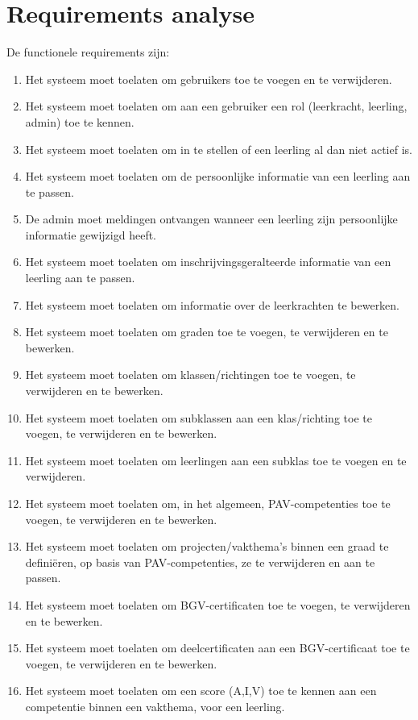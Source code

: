 \documentclass[a4paper]{article}
\begin{document}
\section{Requirements analyse} 
De functionele requirements zijn:
\begin{enumerate}
\item Het systeem moet toelaten om gebruikers toe te voegen en te verwijderen.
\item Het systeem moet toelaten om aan een gebruiker een rol (leerkracht, leerling, admin) toe te kennen.
\item Het systeem moet toelaten om in te stellen of een leerling al dan niet actief is.
\item Het systeem moet toelaten om de persoonlijke informatie van een leerling aan te passen.
\item De admin moet meldingen ontvangen wanneer een leerling zijn persoonlijke informatie gewijzigd heeft.
\item Het systeem moet toelaten om inschrijvingsgeralteerde informatie van een leerling aan te passen.
\item Het systeem moet toelaten om informatie over de leerkrachten te bewerken.
\item Het systeem moet toelaten om graden toe te voegen, te verwijderen en te bewerken.
\item Het systeem moet toelaten om klassen/richtingen toe te voegen, te verwijderen en te bewerken.
\item Het systeem moet toelaten om subklassen aan een klas/richting toe te voegen, te verwijderen en te bewerken.  %
\item Het systeem moet toelaten om leerlingen aan een subklas toe te voegen en te verwijderen.
\item Het systeem moet toelaten om, in het algemeen, PAV-competenties toe te voegen, te verwijderen en te bewerken.
\item Het systeem moet toelaten om projecten/vakthema's binnen een graad te definiëren, op basis van PAV-competenties, ze te verwijderen en aan te passen.
\item Het systeem moet toelaten om BGV-certificaten toe te voegen, te verwijderen en te bewerken.
\item Het systeem moet toelaten om deelcertificaten aan een BGV-certificaat toe te voegen, te verwijderen en te bewerken.
\item Het systeem moet toelaten om een score (A,I,V) toe te kennen aan een competentie binnen een vakthema, voor een leerling.  %

\end{enumerate}
\end{document}
